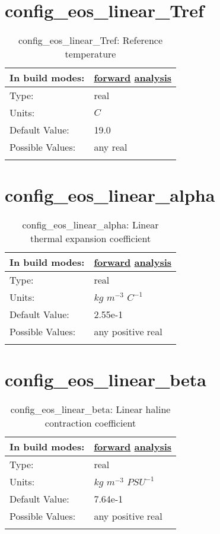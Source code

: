 \section[config\_eos\_linear\_Tref]{config\_eos\_linear\_Tref}
\label{sec:nm_sec_config_eos_linear_Tref}
\begin{center}
\begin{longtable}{| p{2.0in} || p{4.0in} |}
    \hline
    In build modes: & \hyperref[subsec:forward_nm_tab_eos_linear]{forward} \hyperref[subsec:analysis_nm_tab_eos_linear]{analysis} \\
    \hline
    Type: & real \\
    \hline
    Units: & $C$ \\
    \hline
    Default Value: & 19.0 \\
    \hline
    Possible Values: & any real \\
    \hline
    \caption{config\_eos\_linear\_Tref: Reference temperature}
\end{longtable}
\end{center}
\section[config\_eos\_linear\_alpha]{config\_eos\_linear\_alpha}
\label{sec:nm_sec_config_eos_linear_alpha}
\begin{center}
\begin{longtable}{| p{2.0in} || p{4.0in} |}
    \hline
    In build modes: & \hyperref[subsec:forward_nm_tab_eos_linear]{forward} \hyperref[subsec:analysis_nm_tab_eos_linear]{analysis} \\
    \hline
    Type: & real \\
    \hline
    Units: & $kg$ $m^{-3}$ $C^{-1}$ \\
    \hline
    Default Value: & 2.55e-1 \\
    \hline
    Possible Values: & any positive real \\
    \hline
    \caption{config\_eos\_linear\_alpha: Linear thermal expansion coefficient}
\end{longtable}
\end{center}
\section[config\_eos\_linear\_beta]{config\_eos\_linear\_beta}
\label{sec:nm_sec_config_eos_linear_beta}
\begin{center}
\begin{longtable}{| p{2.0in} || p{4.0in} |}
    \hline
    In build modes: & \hyperref[subsec:forward_nm_tab_eos_linear]{forward} \hyperref[subsec:analysis_nm_tab_eos_linear]{analysis} \\
    \hline
    Type: & real \\
    \hline
    Units: & $kg$ $m^{-3}$ $PSU^{-1}$ \\
    \hline
    Default Value: & 7.64e-1 \\
    \hline
    Possible Values: & any positive real \\
    \hline
    \caption{config\_eos\_linear\_beta: Linear haline contraction coefficient}
\end{longtable}
\end{center}
